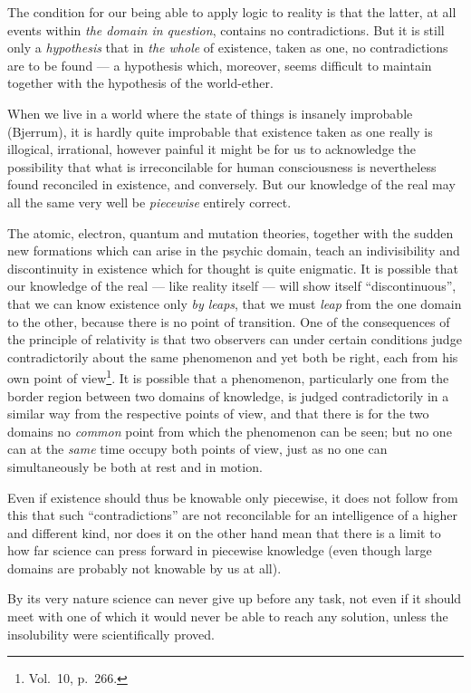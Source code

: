 \documentclass[12pt,a4paper]{article}
\begin{document}
The condition for our being able to apply logic to reality is that the latter,
at all events within \emph{the domain in question}, contains no
contradictions. But it is still only a \emph{hypothesis} that in \emph{the
whole} of existence, taken as one, no contradictions are to be found --- a
hypothesis which, moreover, seems difficult to maintain together with the
hypothesis of the world-ether.

When we live in a world where the state of things is insanely improbable
(Bjerrum), it is hardly quite improbable that existence taken as one really is
illogical, irrational, however painful it might be for us to acknowledge the
possibility that what is irreconcilable for human consciousness is
nevertheless found reconciled in existence, and conversely. But our knowledge
of the real may all the same very well be \emph{piecewise} entirely correct.

The atomic, electron, quantum and mutation theories, together with the sudden
new formations which can arise in the psychic domain, teach an indivisibility
and discontinuity in existence which for thought is quite enigmatic. It is
possible that our knowledge of the real --- like reality itself --- will show
itself ``discontinuous'', that we can know existence only \emph{by leaps},
that we must \emph{leap} from the one domain
\setcounter{footnote}{0}%
to the other, because there is no point of transition. One of the consequences
of the principle of relativity is that two observers can under certain
conditions judge contradictorily about the same phenomenon and yet both be
right, each from his own point of view\footnote{Vol.\ 10, p.\ 266.}. It is
possible that a phenomenon, particularly one from the border region between
two domains of knowledge, is judged contradictorily in a similar way from the
respective points of view, and that there is for the two domains no
\emph{common} point from which the phenomenon can be seen; but no one can at
the \emph{same} time occupy both points of view, just as no one can
simultaneously be both at rest and in motion.

Even if existence should thus be knowable only piecewise, it does not follow
from this that such ``contradictions'' are not reconcilable for an
intelligence of a higher and different kind, nor does it on the other hand
mean that there is a limit to how far science can press forward in piecewise
knowledge (even though large domains are probably not knowable by us at all).

By its very nature science can never give up before any task, not even if it
should meet with one of which it would never be able to reach any solution,
unless the insolubility were scientifically proved.
\end{document}
